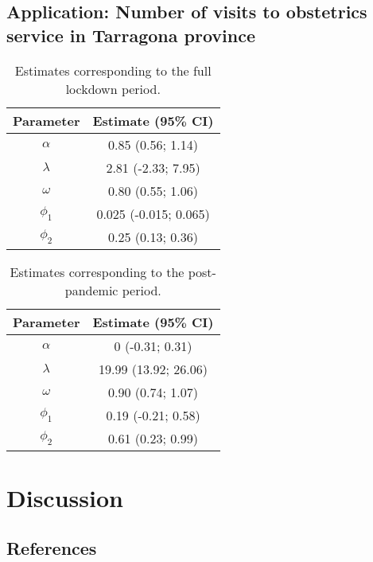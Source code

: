 \documentclass[Afour,sageh,times]{sagej}
\newcommand\BibTeX{{\rmfamily B\kern-.05em \textsc{i\kern-.025em b}\kern-.08em
T\kern-.1667em\lower.7ex\hbox{E}\kern-.125emX}}
\begin{document}
\subsection{Application: Number of visits to obstetrics service in Tarragona province}
\begin{table}[ht]\caption{Estimates corresponding to the full lockdown period.}
  \centering
  \begin{tabular}{ cc }
      \hline
   \textbf{Parameter} & \textbf{Estimate (95\% CI)} \\ 
   \hline
   $\alpha$ & 0.85 (0.56; 1.14) \\
   $\lambda$ & 2.81 (-2.33; 7.95) \\
   $\omega$ & 0.80 (0.55; 1.06) \\
   $\phi_1$ & 0.025 (-0.015; 0.065) \\
   $\phi_2$ & 0.25 (0.13; 0.36) \\
   \hline
  \end{tabular}
\end{table}

\begin{table}[ht]\caption{Estimates corresponding to the post-pandemic period.}
  \centering
  \begin{tabular}{ cc }
      \hline
   \textbf{Parameter} & \textbf{Estimate (95\% CI)} \\ 
   \hline
   $\alpha$ &  0 (-0.31; 0.31) \\
   $\lambda$ & 19.99 (13.92; 26.06) \\
   $\omega$ & 0.90 (0.74; 1.07) \\
   $\phi_1$ & 0.19 (-0.21; 0.58) \\
   $\phi_2$ & 0.61 (0.23; 0.99) \\
   \hline
  \end{tabular}
\end{table}

\section{Discussion}


\subsection{References}
%
%
%
\end{document}
